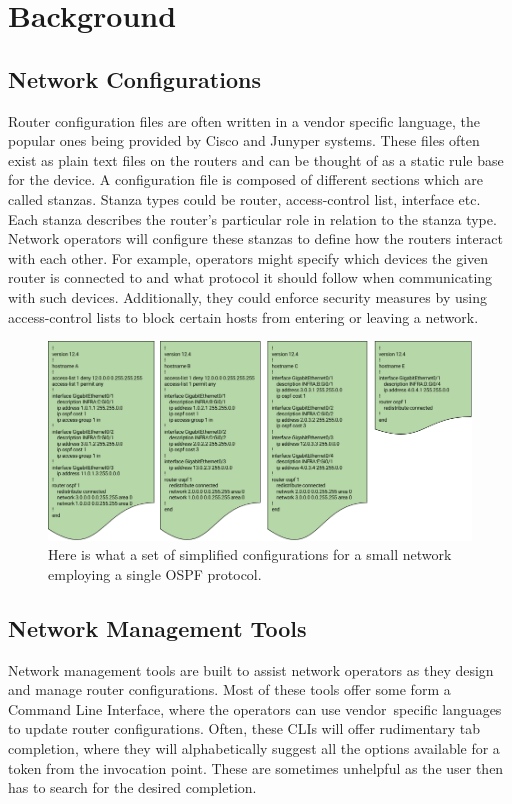 \section{Background}

\subsection{Network Configurations} 

Router configuration files are often written in a vendor specific language, the popular ones being provided by Cisco and Junyper systems. These files often exist as plain text files on the routers and can be thought of as a static rule base for the device. A configuration file is composed of different sections which are called stanzas. Stanza types could be router, access-control list, interface etc. Each stanza describes the router's particular role in relation to the stanza type. Network operators will configure these stanzas to define how the routers interact with each other. For example, operators might specify which devices the given router is connected to and what protocol it should follow when communicating with such devices. Additionally, they could enforce security measures by using access-control lists to block certain hosts from entering or leaving a network. 

\begin{figure}[H]
	\centering
	\includegraphics[width=5in]{configexample.png}
	\caption{Here is what a set of simplified configurations for a small network employing a single OSPF protocol.}
\end{figure}

\subsection{Network Management Tools}

Network management tools are built to assist network operators as they design and manage router configurations. Most of these tools offer some form a Command Line Interface, where the operators can use vendor  specific languages to update router configurations. Often, these CLIs will offer rudimentary tab completion, where they will alphabetically suggest all the options available for a token from the invocation point. These are sometimes unhelpful as the user then has to search for the desired completion.\\ 

